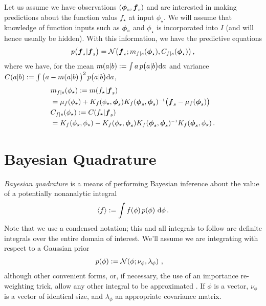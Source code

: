 \documentclass{article}
\renewcommand{\pskinny}[2]{p\big(#1|#2\big)}
\begin{document}
Let us assume we have observations $(\vph_s,\vf_s)$ and
are interested in making predictions about the function
valus $f_\star$ at input $\phi_\star$. We will assume that knowledge of function inputs such as
$\vph_s$ and $\phi_\star$ is incorporated into $I$ (and will hence usually be hidden). With
this information, we have the predictive equations
$$
\pskinny{\vf_\star}{\vf_s} = 
\bN{\vf_\star}
{\meancond{f}{\vph_\star}{s}}
{\covcond{f}{\vph_\star}{s}}\,,
$$
where we have, for the mean $\novmean{a}{b}\deq \int a\,\pskinny{a}{b} \ud
a$ and variance $\novcov{a}{b}\deq \int
\big(a-\novmean{a}{b}\big)^2\,\pskinny{a}{b} \ud a$,
\begin{align} 
\textstyle
&\meancond{f}{\phi_\star}{s}
\deq \mean{f_\star}{\vf_s}
\nonumber\\
&= \mu_{f}(\phi_\star) + 
K_{f}(\phi_\star,\vph_s)
K_{f}(\vph_s,\vph_s)\inv
\bigl(\vf_s-{\mu}_{f}(\vph_s)\bigr) \label{eq:GPMean}
\\
&\covcond{f}{\phi_\star}{s}
\deq {\cov{f_\star}{\vf_s}} 
\nonumber\\
&= K_{f}(\phi_\star,\phi_\star) - 
K_{f}(\phi_\star,\vph_s)
K_{f}(\vph_s,\vph_s)\inv
K_{f}(\vph_s,\phi_\star)\,. \nonumber%
\end{align} 

\section{Bayesian Quadrature} \label{sec:BQ}


\emph{Bayesian quadrature} \citep{BZHermiteQuadrature,BZMonteCarlo} is a means of
performing Bayesian inference about the value of a potentially
nonanalytic integral 
\begin{equation} \label{eq:intyf}
 \inty{f} \deq \int f(\phi)\,\po{\phi}\,\ud\phi\,.
\end{equation}
Note that we use a condensed notation; this and all integrals to follow are definite integrals over the entire domain of interest.
We'll assume we are integrating with respect to a Gaussian
prior
\begin{align}\label{eq:phiprior}
\textstyle
 \po{\phi} & \deq \N{\phi}{\nu_{\phi}}{\lambda_{\phi}} \,,
\end{align}
although other convenient forms, or, if necessary, the use of an
importance re-weighting trick, allow any other integral to be
approximated \citep{OsborneAnon}. If $\phi$ is a vector, $\nu_{\phi}$ is a  vector of identical size, and $\lambda_{\phi}$ an appropriate covariance matrix.
\end{document}
